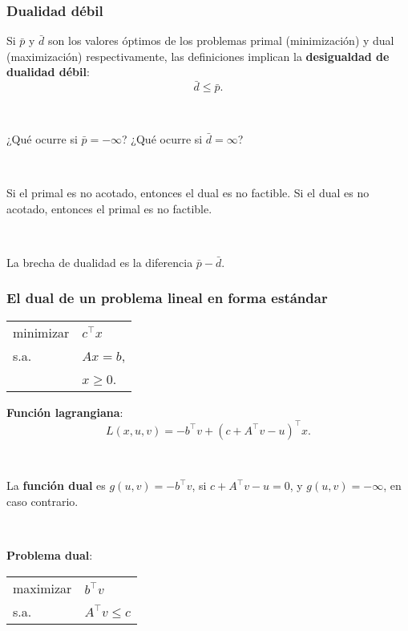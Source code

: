 \documentclass{beamer}
\begin{document}
\begin{frame}
\frametitle{Dualidad débil}

Si $\bar{p}$ y $\bar{d}$ son los valores óptimos de los problemas primal (minimización) y dual (maximización) respectivamente, las definiciones implican la \textbf{desigualdad de dualidad débil}:
\[
\bar{d} \leq \bar{p}.
\]

\

¿Qué ocurre si $\bar{p}=-\infty$? ¿Qué ocurre si $\bar{d}=\infty$?

\

Si el primal es no acotado, entonces el dual es no factible. Si el dual es no acotado, entonces el primal es no factible.

\

La brecha de dualidad es la diferencia $\bar{p}-\bar{d}$.




\end{frame}
\begin{frame}
\frametitle{El dual de un problema lineal en forma estándar}

\begin{center}
\begin{tabular}{ll}
minimizar & $c^\top x$  \\
s.a. & $Ax=b$,     \\
	 & $x\geq 0$.  
\end{tabular}
\end{center}

\textbf{Función lagrangiana}:
\[
L(x,u,v) = -b^\top v + (c+A^\top v -u)^\top x.
\]

\

La \textbf{función dual} es $g(u,v)=-b^\top v$, si $c+A^\top v -u=0$, y $g(u,v)=-\infty$, en caso contrario.


\

\textbf{Problema dual}:

\begin{center}
\begin{tabular}{ll}
maximizar & $b^\top v$  \\
s.a. & $A^\top v \leq c$       
\end{tabular}
\end{center}

\end{frame}
\end{document}
